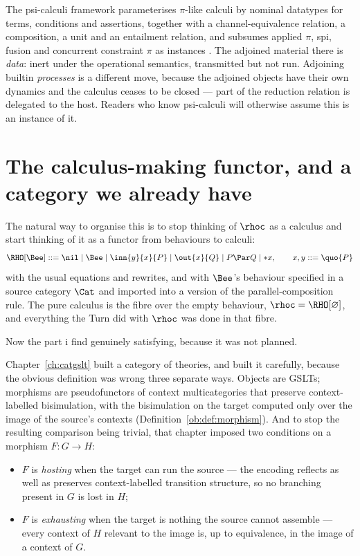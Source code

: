 \begin{remark}
\label{rem:psi}
The psi-calculi framework parameterises $\pi$-like calculi by
nominal datatypes for terms, conditions and assertions, together
with a channel-equivalence relation, a composition, a unit and an
entailment relation, and subsumes applied $\pi$, spi, fusion and
concurrent constraint $\pi$ as instances \cite{bengtson2011}.
The adjoined material there is \emph{data}: inert under the
operational semantics, transmitted but not run.
Adjoining builtin \emph{processes} is a different move, because the
adjoined objects have their own dynamics and the calculus ceases to
be closed --- part of the reduction relation is delegated to the
host.
Readers who know psi-calculi will otherwise assume this is an
instance of it.
\end{remark}

\section{The calculus-making functor, and a category we already have}
\label{sec:functor}

The natural way to organise this is to stop thinking of $\rhoc$ as
a calculus and start thinking of it as a functor from behaviours to
calculi:
\[
\RHO[\Bee] ::= \nil \mid \Bee \mid \inn{y}{x}{P} \mid \out{x}{Q}
\mid P \Par Q \mid *x,
\qquad x, y ::= \quo{P}
\]
with the usual equations and rewrites, and with $\Bee$'s behaviour
specified in a source category $\Cat$ and imported into a version
of the parallel-composition rule.
The pure calculus is the fibre over the empty behaviour,
$\rhoc = \RHO[\varnothing]$, and everything the Turn did with
$\rhoc$ was done in that fibre.

Now the part i find genuinely satisfying, because it was not
planned.

Chapter~\ref{ch:catgslt} built a category of theories, and built it
carefully, because the obvious definition was wrong three separate
ways.
Objects are GSLTs; morphisms are pseudofunctors of context
multicategories that preserve context-labelled bisimulation, with
the bisimulation on the target computed only over the image of the
source's contexts (Definition~\ref{ob:def:morphism}).
And to stop the resulting comparison being trivial, that chapter
imposed two conditions on a morphism $F : G \to H$:

\begin{itemize}[leftmargin=1.6em]
\item $F$ is \emph{hosting} when the target can run the source ---
the encoding reflects as well as preserves context-labelled
transition structure, so no branching present in $G$ is lost in
$H$;
\item $F$ is \emph{exhausting} when the target is nothing the
source cannot assemble --- every context of $H$ relevant to the
image is, up to equivalence, in the image of a context of $G$.
\end{itemize}

